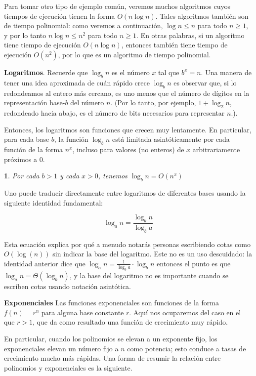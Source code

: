 \documentclass[a4paper, 12pt]{book}
\theoremstyle{dotless}
\newtheorem{theorem}{}[section]
\begin{document}
Para tomar otro tipo de ejemplo común, veremos muchos algoritmos cuyos tiempos de ejecución tienen la forma $O(n\log n)$. Tales algoritmos también son de tiempo polinomial: como veremos a continuación, $\log n ≤ n$ para todo $n ≥ 1$, y por lo tanto $n \log n ≤ n^2$ para todo $n ≥ 1$. En otras palabras, si un algoritmo tiene tiempo de ejecución $O(n\log n)$, entonces también tiene tiempo de ejecución $O(n^2)$, por lo que es un algoritmo de tiempo polinomial.

\textbf{Logaritmos}. Recuerde que $\log_b n$ es el número $x$ tal que $b^x = n$. Una manera de tener una idea aproximada de cuán rápido crece $\log_b n$ es observar que, si lo redondeamos al entero más cercano, es uno menos que el número de dígitos en la representación base-$b$ del número $n$. (Por lo tanto, por ejemplo, $1 + \log_2 n$, redondeado hacia abajo, es el número de bits necesarios para representar $n$.).

Entonces, los logaritmos son funciones que crecen muy lentamente. En particular, para cada base $b$, la función $\log_b n$ está limitada asintóticamente por cada función de la forma $n^x$, incluso para valores (no enteros) de $x$ arbitrariamente próximos a $0$.

\begin{theorem}
Por cada $b>1$ y cada $x>0$, tenemos $\log_bn = O(n^x)$
\end{theorem}

Uno puede traducir directamente entre logaritmos de diferentes bases usando la siguiente identidad fundamental:

$$\log_an = \frac{\log_bn}{\log_ba}$$

Esta ecuación explica por qué a menudo notarás personas escribiendo cotas como $O(\log(n))$ sin indicar la base del logaritmo. Este no es un uso descuidado: la identidad anterior dice que $\log_an = \frac{1}{\log_ba}\cdot\log_bn$ entonces el punto es que $\log_an = \Theta(\log_bn)$, y la base del logaritmo no es importante cuando se escriben cotas usando notación asintótica.


\textbf{Exponenciales} Las funciones exponenciales son funciones de la forma $f(n) = r^n$ para alguna base constante $r$. Aquí nos ocuparemos del caso en el que $r>1$, que da como resultado una función de crecimiento muy rápido.

En particular, cuando los polinomios se elevan a un exponente fijo, los exponenciales elevan un número fijo a $n$ como potencia; esto conduce a tasas de crecimiento mucho más rápidas. Una forma de resumir la relación entre polinomios y exponenciales es la siguiente.
\end{document}
